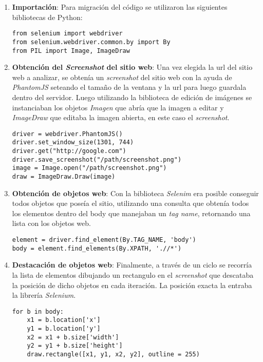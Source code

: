 	\newpage
		\begin{enumerate}
			\item \textbf{Importación}: Para migración del código se utilizaron las siguientes
			bibliotecas de Python:
			\begin{lstlisting}[style=Python, caption={Bibliotecas utilizadas para el mapa de objetos.}]
from selenium import webdriver
from selenium.webdriver.common.by import By
from PIL import Image, ImageDraw
\end{lstlisting}
			\item \textbf{Obtención  del \textit{Screenshot} del sitio web}: Una vez elegida la
			url del sitio web a analizar, se obtenía un \textit{screenshot} del sitio web con 
			la ayuda de \textit{PhantomJS} seteando el tamaño de la ventana y la url para luego
			guardala dentro del servidor. Luego utilizando la biblioteca de edición de imágenes
			se instanciaban los objetos \textit{Imagen} que abría que la imagen a editar y 
			\textit{ImageDraw} que editaba la imagen abierta, en este caso el \textit{screenshot}.
			\begin{lstlisting}[style=Python, caption={Destacación de objetos web}]
driver = webdriver.PhantomJS()
driver.set_window_size(1301, 744)
driver.get("http://google.com")
driver.save_screenshot("/path/screenshot.png")
image = Image.open("/path/screenshot.png")
draw = ImageDraw.Draw(image)
\end{lstlisting}
			\item \textbf{Obtención de objetos web}: Con la biblioteca \textit{Selenim} era
			posible conseguir todos objetos que poseía el sitio, utilizando una consulta que
			obtenía todos los elementos dentro del body que manejaban un \textit{tag name},
			retornando una lista con los objetos web.
\begin{lstlisting}[style=Python, caption={Consulta al body del sitio web.}]
element = driver.find_element(By.TAG_NAME, 'body')
body = element.find_elements(By.XPATH, './/*')
\end{lstlisting}
		\item \textbf{Destacación de objetos web}: Finalmente, a través de un ciclo se recorría
		la lista de elementos dibujando un rectangulo en el \textit{screenshot} que descataba la 
		posición de dicho objetos en cada iteración. La posición exacta la entraba la librería 
		\textit{Selenium}.
\begin{lstlisting}[style=Python, caption={Consulta al body del sitio web.}]
for b in body:
	x1 = b.location['x']
	y1 = b.location['y']
	x2 = x1 + b.size['width']
	y2 = y1 + b.size['height']
	draw.rectangle([x1, y1, x2, y2], outline = 255)
\end{lstlisting}
		\end{enumerate}				
		
